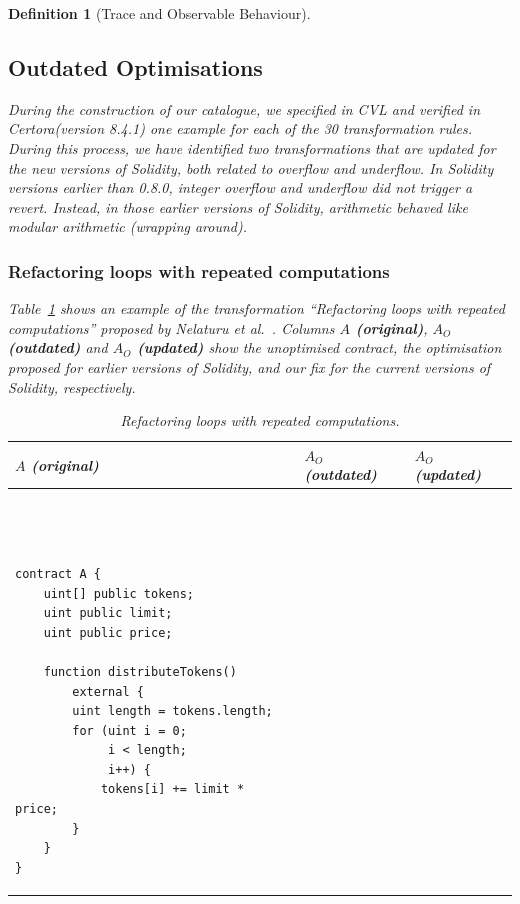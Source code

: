 \documentclass[manuscript,screen,review]{acmart}
\newtheorem{definition}{Definition}
\begin{document}
\begin{definition}[Trace and Observable Behaviour]
\subsection{Outdated Optimisations}

During the construction of our catalogue, we specified in CVL and verified in Certora(version 8.4.1) one example for each of the 30 transformation rules.
During this process, we have identified two transformations that are updated for the new versions of Solidity, both related to overflow and underflow. In Solidity versions earlier than 0.8.0, integer overflow and underflow did not trigger a revert. Instead, in those earlier versions of Solidity, arithmetic behaved like modular arithmetic (wrapping around).

\subsubsection{Refactoring loops with repeated computations}
\label{sec:outdated_loops}

Table~\ref{tab:loop_refactoring} shows an example of the transformation ``Refactoring loops with repeated computations'' proposed by Nelaturu {\em et al.\/}~\cite{Nelaturu2021}. Columns {\bf $A$ (original)}, {\bf $A_O$ (outdated)} and {\bf $A_O$ (updated)} show the unoptimised contract, the optimisation proposed for earlier versions of Solidity, and our fix for the current versions of Solidity, respectively.

\begin{table}[htb]
\caption{Refactoring loops with repeated computations.}
\label{tab:loop_refactoring}
\centering
\begin{footnotesize}
\begin{tabular}{|p{}|p{}|p{}|}
\hline
\rowcolor[HTML]{EFEFEF}
\textbf{$A$ (original)} & \textbf{$A_O$ (outdated)} & \textbf{$A_O$ (updated)} \\ \hline
\vspace*{-0.5cm}
\begin{verbatim}



contract A {
    uint[] public tokens;
    uint public limit;
    uint public price;
    
    function distributeTokens() 
        external {
        uint length = tokens.length;
        for (uint i = 0; 
             i < length; 
             i++) {
            tokens[i] += limit * price;
        }
    }
}
\end{verbatim}
&
\vspace*{-0.5cm}
\begin{verbatim}




\end{verbatim}
\end{tabular}
\end{footnotesize}
\end{table}
\end{definition}
\end{document}
